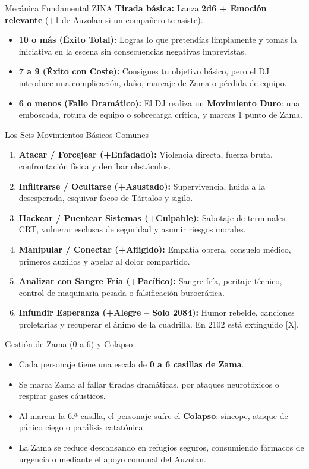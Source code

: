 \begin{CajaRegla}{Mecánica Fundamental ZINA}
\textbf{Tirada básica:} Lanza \textbf{2d6 + Emoción relevante} (+1 de Auzolan si un compañero te asiste).
\begin{itemize}
    \item \textbf{10 o más (Éxito Total):} Logras lo que pretendías limpiamente y tomas la iniciativa en la escena sin consecuencias negativas imprevistas.
    \item \textbf{7 a 9 (Éxito con Coste):} Consigues tu objetivo básico, pero el DJ introduce una complicación, daño, marcaje de Zama o pérdida de equipo.
    \item \textbf{6 o menos (Fallo Dramático):} El DJ realiza un \textbf{Movimiento Duro}: una emboscada, rotura de equipo o sobrecarga crítica, y marcas 1 punto de Zama.
\end{itemize}
\end{CajaRegla}

\begin{CajaRegla}{Los Seis Movimientos Básicos Comunes}
\begin{enumerate}
    \item \textbf{Atacar / Forcejear (+Enfadado):} Violencia directa, fuerza bruta, confrontación física y derribar obstáculos.
    \item \textbf{Infiltrarse / Ocultarse (+Asustado):} Supervivencia, huida a la desesperada, esquivar focos de Tártalos y sigilo.
    \item \textbf{Hackear / Puentear Sistemas (+Culpable):} Sabotaje de terminales CRT, vulnerar esclusas de seguridad y asumir riesgos morales.
    \item \textbf{Manipular / Conectar (+Afligido):} Empatía obrera, consuelo médico, primeros auxilios y apelar al dolor compartido.
    \item \textbf{Analizar con Sangre Fría (+Pacífico):} Sangre fría, peritaje técnico, control de maquinaria pesada o falsificación burocrática.
    \item \textbf{Infundir Esperanza (+Alegre -- Solo 2084):} Humor rebelde, canciones proletarias y recuperar el ánimo de la cuadrilla. En 2102 está extinguido [X].
\end{enumerate}
\end{CajaRegla}

\begin{CajaRegla}{Gestión de Zama (0 a 6) y Colapso}
\begin{itemize}
    \item Cada personaje tiene una escala de \textbf{0 a 6 casillas de Zama}.
    \item Se marca Zama al fallar tiradas dramáticas, por ataques neurotóxicos o respirar gases cáusticos.
    \item Al marcar la 6.ª casilla, el personaje sufre el \textbf{Colapso}: síncope, ataque de pánico ciego o parálisis catatónica.
    \item La Zama se reduce descansando en refugios seguros, consumiendo fármacos de urgencia o mediante el apoyo comunal del Auzolan.
\end{itemize}
\end{CajaRegla}
